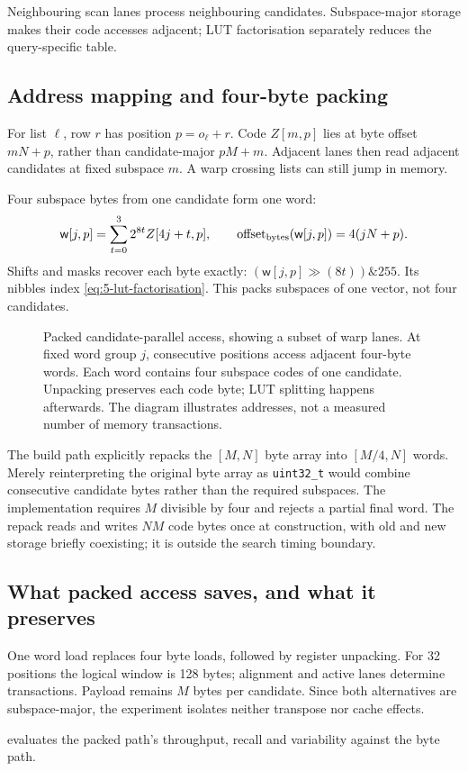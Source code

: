Neighbouring scan lanes process neighbouring candidates. Subspace-major
storage makes their code accesses adjacent; LUT factorisation separately
reduces the query-specific table.

\subsection{Address mapping and four-byte packing}

For list $\ell$, row $r$ has position $p=o_\ell+r$. Code $Z[m,p]$ lies at byte offset $mN+p$, rather than candidate-major $pM+m$. Adjacent lanes then read adjacent candidates at fixed subspace $m$. A warp crossing lists can still jump in memory.

Four subspace bytes from one candidate form one word:
\begin{equation}
 \mathsf{w}[j,p]=\sum_{t=0}^{3}2^{8t}Z[4j+t,p],\qquad
 \operatorname{offset}_{\rm bytes}(\mathsf{w}[j,p])=4(jN+p).
 \label{eq:5-packed-layout}
\end{equation}
Shifts and masks recover each byte exactly: $(\mathsf w[j,p]\gg(8t))\mathbin{\&}255$. Its nibbles index \cref{eq:5-lut-factorisation}. This packs subspaces of one vector, not four candidates.

\begin{figure}[tbp]
\centering

\caption[Packed candidate-parallel access]{Packed candidate-parallel access, showing a subset of warp lanes.
At fixed word group $j$, consecutive positions access adjacent four-byte
words. Each word contains four subspace codes of one candidate. Unpacking
preserves each code byte; LUT splitting happens afterwards. The diagram
illustrates addresses, not a measured number of memory transactions.}
\label{fig:5-packed-access}
\end{figure}

The build path explicitly repacks the $[M,N]$ byte array into
$[M/4,N]$ words. Merely reinterpreting the original byte array as
\texttt{uint32\_t} would combine consecutive candidate bytes rather
than the required subspaces. The implementation requires $M$ divisible
by four and rejects a partial final word. The repack reads and writes
$NM$ code bytes once at construction, with old and new storage briefly
coexisting; it is outside the search timing boundary.

\subsection{What packed access saves, and what it preserves}

One word load replaces four byte loads, followed by register unpacking. For 32 positions the logical window is 128 bytes; alignment and active lanes determine transactions. Payload remains $M$ bytes per candidate. Since both alternatives are subspace-major, the experiment isolates neither transpose nor cache effects.

 evaluates the packed path's throughput, recall and
variability against the byte path.
